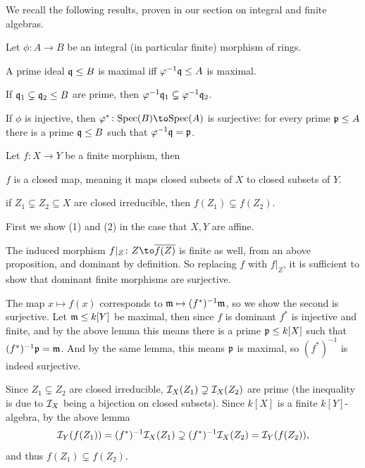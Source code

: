 We recall the following results, proven in our section on integral and finite algebras.

\blemm

    Let $\phi\colon A\to B$ be an integral (in particular finite) morphism of rings.
    \benum
        \item A prime ideal ${{\frak q}}\leq B$ is maximal iff $\varphi^{-1}{{\frak q}}\leq A$ is maximal.
        \item If ${{\frak q}}_1\subsetneq{{\frak q}}_2\leq B$ are prime, then $\varphi^{-1}{{\frak q}}_1\subsetneq\varphi^{-1}{{\frak q}}_2$.
        \item If $\phi$ is injective, then $\phi^*\colon\spec(B)\to\spec(A)$ is surjective: for every prime ${{\frak p}}\leq A$ there is a prime ${{\frak q}}\leq B$ such that
        $\varphi^{-1}{{\frak q}}={{\frak p}}$.
    \eenum

\elemm

\bprop

    Let $f\colon X\to Y$ be a finite morphism, then
    \benum
        \item $f$ is a closed map, meaning it maps closed subsets of $X$ to closed subsets of $Y$.
        \item if $Z_1\subsetneq Z_2\subseteq X$ are closed irreducible, then $f(Z_1)\subsetneq f(Z_2)$.
    \eenum

\eprop

\bproof

    First we show (1) and (2) in the case that $X,Y$ are affine.

    The induced morphism $f|_Z\colon Z\to\cl{f(Z)}$ is finite as well, from an above proposition, and dominant by definition.
    So replacing $f$ with $f|_Z$, it is sufficient to show that dominant finite morphisms are surjective.

    The map $x\mapsto f(x)$ corresponds to ${{\frak m}}\mapsto(f^*)^{-1}{{\frak m}}$, so we show the second is surjective.
    Let ${{\frak m}}\leq k[Y]$ be maximal, then since $f$ is dominant $f^*$ is injective and finite, and by the above lemma this means there is a prime ${{\frak p}}\leq k[X]$
    such that $(f^*)^{-1}{{\frak p}}={{\frak m}}$.
    And by the same lemma, this means ${{\frak p}}$ is maximal, so $(f^*)^{-1}$ is indeed surjective.

    Since $Z_1\subsetneq Z_2$ are closed irreducible, ${{\cal I}}_X(Z_1)\supsetneq{{\cal I}}_X(Z_2)$ are prime (the inequality is due to ${{\cal I}}_X$ being a bijection on closed subsets).
    Since $k[X]$ is a finite $k[Y]$-algebra, by the above lemma
    $$ {{\cal I}}_Y(f(Z_1)) = (f^*)^{-1}{{\cal I}}_X(Z_1) \supsetneq (f^*)^{-1}{{\cal I}}_X(Z_2) = {{\cal I}}_Y(f(Z_2)) , $$
    and thus $f(Z_1)\subsetneq f(Z_2)$.

